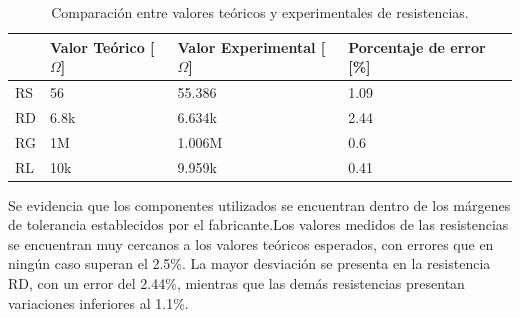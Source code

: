 \documentclass[journal]{IEEEtran}
\begin{document}
\begin{table}[h]
    \caption{Comparación entre valores teóricos y experimentales de resistencias.}
    \centering
    \renewcommand{\arraystretch}{1.2} %
    \begin{tabular}{|l|p{2cm}|p{2cm}|p{2cm}|}
        \hline
        & \textbf{Valor Teórico [$\Omega$]} &
        \textbf{Valor Experimental [$\Omega$]} & 
        \textbf{Porcentaje de error [\%]} \\
        \hline
        RS & 56  & 55.386  & 1.09 \\
        \hline
        RD & 6.8k   & 6.634k  & 2.44 \\
        \hline
        RG & 1M & 1.006M & 0.6 \\
        \hline
        RL & 10k & 9.959k & 0.41 \\
        \hline
    \end{tabular}
    \label{tab:resistencias2}
\end{table}
\par Se evidencia que los componentes utilizados se encuentran dentro de los márgenes de tolerancia establecidos por el fabricante.Los valores medidos de las resistencias se encuentran muy cercanos a los valores teóricos esperados, con errores que en ningún caso superan el 2.5\%. La mayor desviación se presenta en la resistencia RD, con un error del 2.44\%, mientras que las demás resistencias presentan variaciones inferiores al 1.1\%.
\end{document}
